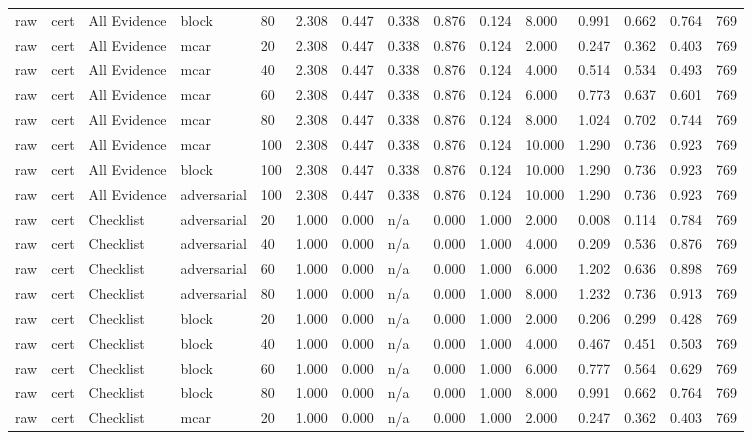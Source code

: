 \begin{table}[!ht]
{\begin{tabular}{lllllllllllllll}
raw & cert & All Evidence & block & 80 & 2.308 & 0.447 & 0.338 & 0.876 & 0.124 & 8.000 & 0.991 & 0.662 & 0.764 & 769 \\
raw & cert & All Evidence & mcar & 20 & 2.308 & 0.447 & 0.338 & 0.876 & 0.124 & 2.000 & 0.247 & 0.362 & 0.403 & 769 \\
raw & cert & All Evidence & mcar & 40 & 2.308 & 0.447 & 0.338 & 0.876 & 0.124 & 4.000 & 0.514 & 0.534 & 0.493 & 769 \\
raw & cert & All Evidence & mcar & 60 & 2.308 & 0.447 & 0.338 & 0.876 & 0.124 & 6.000 & 0.773 & 0.637 & 0.601 & 769 \\
raw & cert & All Evidence & mcar & 80 & 2.308 & 0.447 & 0.338 & 0.876 & 0.124 & 8.000 & 1.024 & 0.702 & 0.744 & 769 \\
raw & cert & All Evidence & mcar & 100 & 2.308 & 0.447 & 0.338 & 0.876 & 0.124 & 10.000 & 1.290 & 0.736 & 0.923 & 769 \\
raw & cert & All Evidence & block & 100 & 2.308 & 0.447 & 0.338 & 0.876 & 0.124 & 10.000 & 1.290 & 0.736 & 0.923 & 769 \\
raw & cert & All Evidence & adversarial & 100 & 2.308 & 0.447 & 0.338 & 0.876 & 0.124 & 10.000 & 1.290 & 0.736 & 0.923 & 769 \\
raw & cert & Checklist & adversarial & 20 & 1.000 & 0.000 & n/a & 0.000 & 1.000 & 2.000 & 0.008 & 0.114 & 0.784 & 769 \\
raw & cert & Checklist & adversarial & 40 & 1.000 & 0.000 & n/a & 0.000 & 1.000 & 4.000 & 0.209 & 0.536 & 0.876 & 769 \\
raw & cert & Checklist & adversarial & 60 & 1.000 & 0.000 & n/a & 0.000 & 1.000 & 6.000 & 1.202 & 0.636 & 0.898 & 769 \\
raw & cert & Checklist & adversarial & 80 & 1.000 & 0.000 & n/a & 0.000 & 1.000 & 8.000 & 1.232 & 0.736 & 0.913 & 769 \\
raw & cert & Checklist & block & 20 & 1.000 & 0.000 & n/a & 0.000 & 1.000 & 2.000 & 0.206 & 0.299 & 0.428 & 769 \\
raw & cert & Checklist & block & 40 & 1.000 & 0.000 & n/a & 0.000 & 1.000 & 4.000 & 0.467 & 0.451 & 0.503 & 769 \\
raw & cert & Checklist & block & 60 & 1.000 & 0.000 & n/a & 0.000 & 1.000 & 6.000 & 0.777 & 0.564 & 0.629 & 769 \\
raw & cert & Checklist & block & 80 & 1.000 & 0.000 & n/a & 0.000 & 1.000 & 8.000 & 0.991 & 0.662 & 0.764 & 769 \\
raw & cert & Checklist & mcar & 20 & 1.000 & 0.000 & n/a & 0.000 & 1.000 & 2.000 & 0.247 & 0.362 & 0.403 & 769 \\

\end{tabular}}
\end{table}
